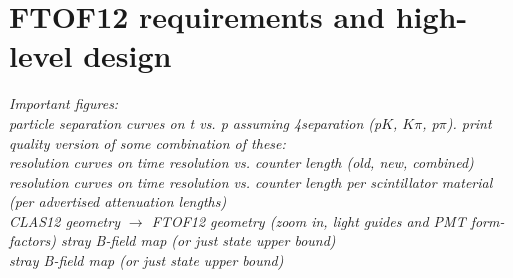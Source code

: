 \section{FTOF12 requirements and high-level design}
\label{FTOF12}


{\it Important figures:\\
particle separation curves on t vs. p assuming 4separation (p$K$, $K\pi$, p$\pi$).  print quality version of some combination of these: \\
resolution curves on time resolution vs. counter length (old, new, combined) \\
resolution curves on time resolution vs. counter length per scintillator material (per advertised attenuation lengths)\\
CLAS12 geometry $\rightarrow$ FTOF12 geometry (zoom in, light guides and PMT form-factors)
stray B-field map (or just state upper bound)\\
stray B-field map (or just state upper bound)
}

